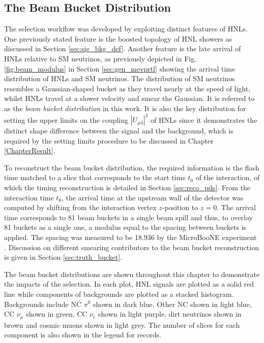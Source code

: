 \subsection{The Beam Bucket Distribution}
\label{sec:key_dist}

The selection workflow was developed by exploiting distinct features of HNLs.
One previously stated feature is the boosted topology of HNL showers as discussed in Section \ref{sec:sig_bkg_def}.
Another feature is the late arrival of HNLs relative to SM neutrinos, as previously depicted in Fig. \ref{fig:beam_modulus} in Section \ref{sec:gen_mevprtl} showing the arrival time distribution of HNLs and SM neutrinos.
The distribution of SM neutrinos resembles a Gaussian-shaped bucket as they travel nearly at the speed of light, whilst HNLs travel at a slower velocity and smear the Gaussian.
It is referred to as the \textit{beam bucket distribution} in this work.
It is also the key distribution for setting the upper limits on the coupling $|U_{\mu4}|^2$ of HNLs since it demonstrates the distinct shape difference between the signal and the background, which is required by the setting limits procedure to be discussed in Chapter \ref{ChapterResult}.

To reconstruct the beam bucket distribution, the required information is the flash time matched to a slice that corresponds to the start time $t_0$ of the interaction, of which the timing reconstruction is detailed in Section \ref{sec:reco_pds}.
From the interaction time $t_0$, the arrival time at the upstream wall of the detector was computed by shifting from the interaction vertex $z$-position to $z = 0$.
The arrival time corresponds to 81 beam buckets in a single beam spill and thus, to overlay 81 buckets as a single one, a modulus equal to the spacing between buckets is applied.
The spacing was measured to be 18.936 by the MicroBooNE experiment \cite{uboone_ns}.
Discussion on different smearing contributors to the beam bucket reconstruction is given in Section \ref{sec:truth_bucket}.

The beam bucket distributions are shown throughout this chapter to demonstrate the impacts of the selection.
In each plot, HNL signals are plotted as a solid red line while components of backgrounds are plotted as a stacked histogram.
Backgrounds include NC $\pi^0$ shown in dark blue, Other NC shown in light blue, CC $\nu_{\mu}$ shown in green, CC $\nu_e$ shown in light purple, dirt neutrinos shown in brown and cosmic muons shown in light grey.
The number of slices for each component is also shown in the legend for records.

